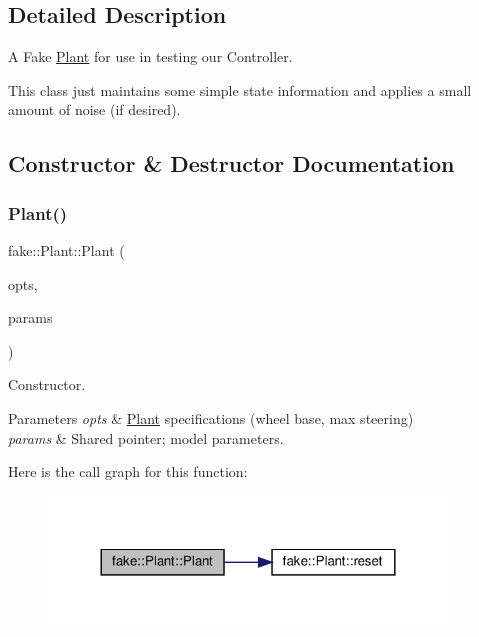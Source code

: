 \subsection{Detailed Description}
A Fake \hyperlink{classfake_1_1_plant}{Plant} for use in testing our Controller. 

This class just maintains some simple state information and applies a small amount of noise (if desired). 

\subsection{Constructor \& Destructor Documentation}
\mbox{\label{classfake_1_1_plant_a346cd2379207256138a0996960461d16}} 
\subsubsection{\texorpdfstring{Plant()}{Plant()}}
{\footnotesize\ttfamily fake\+::\+Plant\+::\+Plant (\begin{DoxyParamCaption}\item[{const \hyperlink{structfake_1_1_plant_options}{Plant\+Options} \&}]{opts,  }\item[{const std\+::shared\+\_\+ptr$<$ const \hyperlink{structackermann_1_1_params}{ackermann\+::\+Params} $>$ \&}]{params }\end{DoxyParamCaption})\hspace{0.3cm}{\ttfamily [explicit]}}



Constructor. 


\begin{DoxyParams}{Parameters}
{\em opts} & \hyperlink{classfake_1_1_plant}{Plant} specifications (wheel base, max steering) \\
\hline
{\em params} & Shared pointer; model parameters. \\
\hline
\end{DoxyParams}
Here is the call graph for this function\+:
\nopagebreak
\begin{figure}[H]
\begin{center}
\leavevmode
\includegraphics[width=300pt]{classfake_1_1_plant_a346cd2379207256138a0996960461d16_cgraph}
\end{center}
\end{figure}


